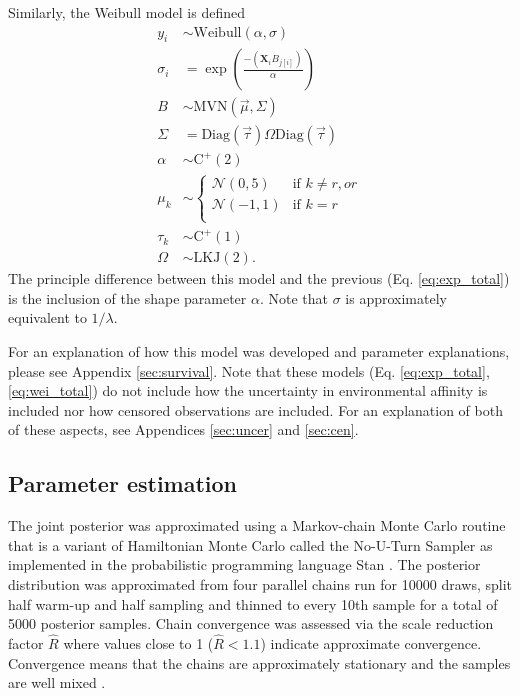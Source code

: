 \documentclass[12pt,letterpaper]{article}
\begin{document}
Similarly, the Weibull model is defined
\begin{equation}
  \begin{aligned}
    y_{i} &\sim \mathrm{Weibull}(\alpha, \sigma) \\
    \sigma_{i} &= \exp\left(\frac{-(\mathbf{X}_{i} B_{j[i]})}{\alpha}\right) \\
    B &\sim \mathrm{MVN}(\vec{\mu}, \Sigma) \\
    \Sigma &= \text{Diag}(\vec{\tau}) \Omega \text{Diag}(\vec{\tau}) \\
    \alpha &\sim \mathrm{C^{+}}(2) \\
    \mu_{k} &\sim 
    \begin{cases} 
      \mathcal{N}(0, 5) & \text{if } k \neq r, or \\
      \mathcal{N}(-1, 1) & \text{if } k = r \\ 
    \end{cases} \\
    \tau_{k} &\sim \mathrm{C^{+}}(1) \\
    \Omega &\sim \text{LKJ}(2).
  \end{aligned}
  \label{eq:wei_total}
\end{equation}
The principle difference between this model and the previous (Eq. \ref{eq:exp_total}) is the inclusion of the shape parameter \(\alpha\). Note that \(\sigma\) is approximately equivalent to \(1 / \lambda\).

For an explanation of how this model was developed and parameter explanations, please see Appendix \ref{sec:survival}. Note that these models (Eq. \ref{eq:exp_total}, \ref{eq:wei_total}) do not include how the uncertainty in environmental affinity is included nor how censored observations are included. For an explanation of both of these aspects, see Appendices \ref{sec:uncer} and \ref{sec:cen}.

\subsection{Parameter estimation}
The  joint posterior was approximated using a Markov-chain Monte Carlo routine that is a variant of Hamiltonian Monte Carlo called the No-U-Turn Sampler \citep{Hoffman2014} as implemented in the probabilistic programming language Stan \citep{2014stan}. The posterior distribution was approximated from four parallel chains run for 10000 draws, split half warm-up and half sampling and thinned to every 10th sample for a total of 5000 posterior samples. Chain convergence was assessed via the scale reduction factor \(\hat{R}\) where values close to 1 (\(\hat{R} < 1.1\)) indicate approximate convergence. Convergence means that the chains are approximately stationary and the samples are well mixed \citep{Gelman2013d}.
\end{document}
